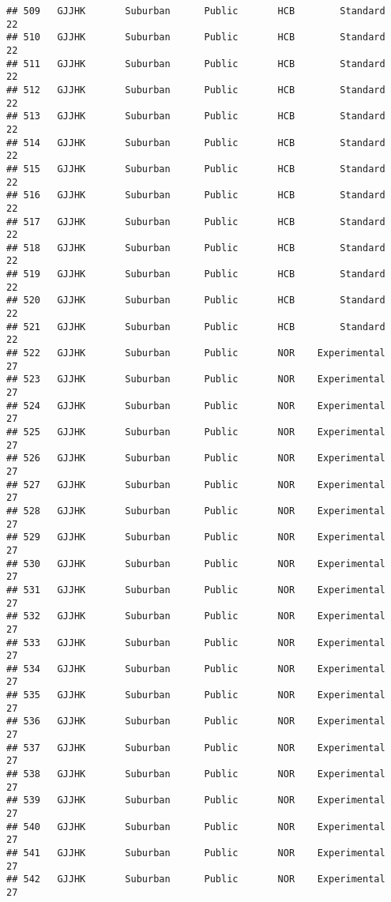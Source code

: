\documentclass[
]{article}
\begin{document}
\begin{verbatim}
## 509   GJJHK       Suburban      Public       HCB        Standard        22
## 510   GJJHK       Suburban      Public       HCB        Standard        22
## 511   GJJHK       Suburban      Public       HCB        Standard        22
## 512   GJJHK       Suburban      Public       HCB        Standard        22
## 513   GJJHK       Suburban      Public       HCB        Standard        22
## 514   GJJHK       Suburban      Public       HCB        Standard        22
## 515   GJJHK       Suburban      Public       HCB        Standard        22
## 516   GJJHK       Suburban      Public       HCB        Standard        22
## 517   GJJHK       Suburban      Public       HCB        Standard        22
## 518   GJJHK       Suburban      Public       HCB        Standard        22
## 519   GJJHK       Suburban      Public       HCB        Standard        22
## 520   GJJHK       Suburban      Public       HCB        Standard        22
## 521   GJJHK       Suburban      Public       HCB        Standard        22
## 522   GJJHK       Suburban      Public       NOR    Experimental        27
## 523   GJJHK       Suburban      Public       NOR    Experimental        27
## 524   GJJHK       Suburban      Public       NOR    Experimental        27
## 525   GJJHK       Suburban      Public       NOR    Experimental        27
## 526   GJJHK       Suburban      Public       NOR    Experimental        27
## 527   GJJHK       Suburban      Public       NOR    Experimental        27
## 528   GJJHK       Suburban      Public       NOR    Experimental        27
## 529   GJJHK       Suburban      Public       NOR    Experimental        27
## 530   GJJHK       Suburban      Public       NOR    Experimental        27
## 531   GJJHK       Suburban      Public       NOR    Experimental        27
## 532   GJJHK       Suburban      Public       NOR    Experimental        27
## 533   GJJHK       Suburban      Public       NOR    Experimental        27
## 534   GJJHK       Suburban      Public       NOR    Experimental        27
## 535   GJJHK       Suburban      Public       NOR    Experimental        27
## 536   GJJHK       Suburban      Public       NOR    Experimental        27
## 537   GJJHK       Suburban      Public       NOR    Experimental        27
## 538   GJJHK       Suburban      Public       NOR    Experimental        27
## 539   GJJHK       Suburban      Public       NOR    Experimental        27
## 540   GJJHK       Suburban      Public       NOR    Experimental        27
## 541   GJJHK       Suburban      Public       NOR    Experimental        27
## 542   GJJHK       Suburban      Public       NOR    Experimental        27

\end{verbatim}
\end{document}
